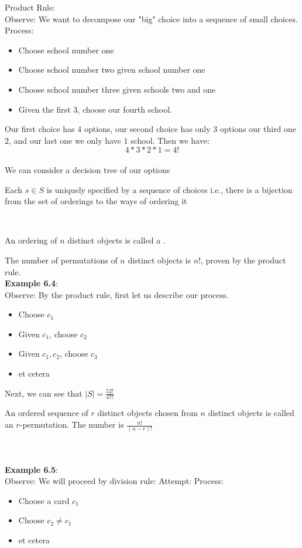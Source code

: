 \documentclass[11pt]{scrartcl}
\begin{document}
Product Rule:\\
Observe: We want to decompose our "big" choice into a sequence of small choices. 
Process: \begin{itemize}
    \item Choose school number one
    \item Choose school number two given school number one
    \item Choose school number three given schools two and one
    \item Given the first 3, choose our fourth school.
\end{itemize}
Our first choice has $4$ options, our second choice has only $3$ options our third one $2$, and our last one we only have $1$ school.  Then we have: $$4*3*2*1 = 4!$$  \\
We can consider a decision tree of our options
\begin{remark}
    Each $s \in S$ is uniquely specified by a sequence of choices i.e., there is a bijection from the set of orderings to the ways of ordering it 
\end{remark}
\\
\begin{definition}
    An ordering of $n$ distinct objects is called a . 
\end{definition}
The number of permutations of $n$ distinct objects is $n!$, proven by the product rule.
\\
\noindent
\textbf{Example 6.4}: \\ \noindent
Observe: By the product rule, first let us describe our process. \begin{itemize}
    \item Choose $c_1$
    \item Given $c_1$, choose $c_2$
    \item Given $c_1, c_2$, choose $c_3$
    \item et cetera
\end{itemize}
Next, we can see that $|S| = \frac{52!}{47!}$
\begin{definition}
    An ordered sequence of $r$ distinct objects chosen from $n$ distinct objects is called an $r$-permutation.  The number is $\frac{n!}{(n-r)!}$
\end{definition}
\\
\\
\noindent
\textbf{Example 6.5}: \\ \noindent
Observe: We will proceed by division rule: Attempt: Process: \begin{itemize}
    \item Choose a card $c_1$
    \item Choose $c_2 \neq c_1$
    \item et cetera
\end{itemize}
\end{document}
